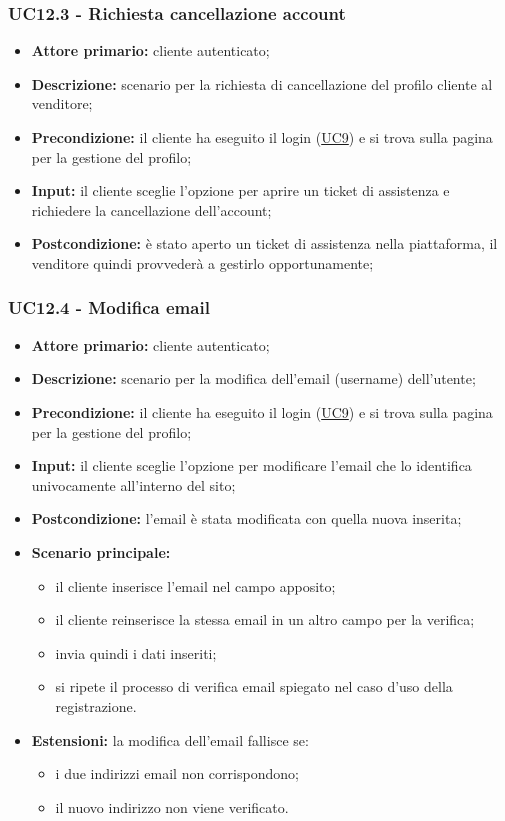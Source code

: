 \subsubsection{UC12.3 - Richiesta cancellazione account}
\label{UC12.3}
\begin{itemize}
    \item \textbf{Attore primario:} cliente autenticato;
    \item \textbf{Descrizione:} scenario per la richiesta di cancellazione del profilo cliente al venditore;
    \item \textbf{Precondizione:} il cliente ha eseguito il login (\hyperref[UC9]{UC9}) e si trova sulla pagina per la gestione del profilo;
    \item \textbf{Input:} il cliente sceglie l'opzione per aprire un ticket di assistenza e richiedere la cancellazione dell'account;
    \item \textbf{Postcondizione:} è stato aperto un ticket di assistenza nella piattaforma, il venditore quindi provvederà a gestirlo opportunamente;
\end{itemize}

\subsubsection{UC12.4 - Modifica email}
\label{UC12.4}
\begin{itemize}
    \item \textbf{Attore primario:} cliente autenticato;
    \item \textbf{Descrizione:} scenario per la modifica dell'email (username) dell'utente;
    \item \textbf{Precondizione:} il cliente ha eseguito il login (\hyperref[UC9]{UC9}) e si trova sulla pagina per la gestione del profilo;
    \item \textbf{Input:} il cliente sceglie l'opzione per modificare l'email che lo identifica univocamente all'interno del sito;
    \item \textbf{Postcondizione:} l'email è stata modificata con quella nuova inserita;
    \item \textbf{Scenario principale:}
    \begin{itemize}
        \item il cliente inserisce l'email nel campo apposito;
        \item il cliente reinserisce la stessa email in un altro campo per la verifica;
        \item invia quindi i dati inseriti;
        \item si ripete il processo di verifica email spiegato nel caso d'uso della registrazione.
    \end{itemize}
    \item \textbf{Estensioni:} la modifica dell'email fallisce se:
    \begin{itemize}
        \item i due indirizzi email non corrispondono;
        \item il nuovo indirizzo non viene verificato.
    \end{itemize}
\end{itemize}

